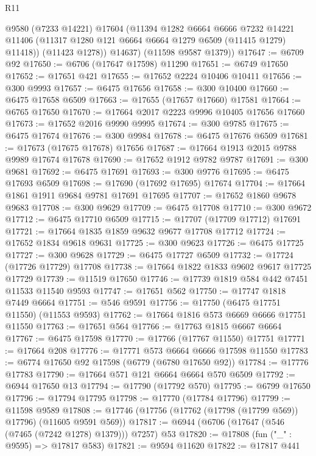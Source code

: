\begin{lexlean}{R11}
\begin{coremodule}
{{{{{{{{{{{{{{{{{{{{{{{{{{{{{{{{{{{{{{{{{{{{{{{{{{{{{{{{{{{{{{{{{{{{{{{{{{{{{{{{{{          @9580
          (@7233 @14221)
          @17604
          (@11394
            @1282
            @6664
            @6666
            @7232
            @14221
            @11406
            (@11317 @1280 @121 @6664 @6664 @1279 @6509 (@11415 @1279) @11418))
          (@11423 @1278))
        @14637)
      (@11598 @9587 @1379))
@17647 := @6709 @92
@17650 := @6706 (@17647 @17598) @11290
@17651 := @6749 @17650
@17652 := @17651 @421
@17655 := @17652 @2224 @10406 @10411
@17656 := @300 @9993
@17657 := @6475 @17656
@17658 := @300 @10400
@17660 := @6475 @17658 @6509
@17663 := @17655 (@17657 @17660) @17581
@17664 := @6765 @17650
@17670 := @17664 @2017 @2223 @9996 @10405 @17656 @17660
@17673 := @17652 @2016 @9990 @9995
@17674 := @300 @9785
@17675 := @6475 @17674
@17676 := @300 @9984
@17678 := @6475 @17676 @6509
@17681 := @17673 (@17675 @17678) @17656
@17687 := @17664 @1913 @2015 @9788 @9989 @17674 @17678
@17690 := @17652 @1912 @9782 @9787
@17691 := @300 @9681
@17692 := @6475 @17691
@17693 := @300 @9776
@17695 := @6475 @17693 @6509
@17698 := @17690 (@17692 @17695) @17674
@17704 := @17664 @1861 @1911 @9684 @9781 @17691 @17695
@17707 := @17652 @1860 @9678 @9683
@17708 := @300 @9629
@17709 := @6475 @17708
@17710 := @300 @9672
@17712 := @6475 @17710 @6509
@17715 := @17707 (@17709 @17712) @17691
@17721 := @17664 @1835 @1859 @9632 @9677 @17708 @17712
@17724 := @17652 @1834 @9618 @9631
@17725 := @300 @9623
@17726 := @6475 @17725
@17727 := @300 @9628
@17729 := @6475 @17727 @6509
@17732 := @17724 (@17726 @17729) @17708
@17738 := @17664 @1822 @1833 @9602 @9617 @17725 @17729
@17739 := @11519 @17650
@17746 := @17739 @1819 @584 @442 @7451 @11533 @11540 @9593
@17747 := @17651 @562
@17750 := @17747 @1818 @7449 @6664
@17751 := @546 @9591
@17756 := @17750 (@6475 @17751 @11550) (@11553 @9593)
@17762 := @17664 @1816 @573 @6669 @6666 @17751 @11550
@17763 := @17651 @564
@17766 := @17763 @1815 @6667 @6664
@17767 := @6475 @17598
@17770 := @17766 (@17767 @11550) @17751
@17771 := @17664 @208
@17776 := @17771 @573 @6664 @6666 @17598 @11550
@17783 := @6774 @17650 @92 @17598 (@6779 (@6780 @17650 @92))
@17784 := @17776 @17783
@17790 := @17664 @571 @121 @6664 @6664 @570 @6509
@17792 := @6944 @17650 @13
@17794 := @17790 (@17792 @570)
@17795 := @6799 @17650
@17796 := @17794 @17795
@17798 := @17770 (@17784 @17796)
@17799 := @11598 @9589
@17808 := @17746 (@17756 (@17762 (@17798 (@17799 @569)) @17796) (@11605 @9591 @569))
@17817 := @6944 (@6706 (@17647 (@546 (@7465 (@7242 @1278) @1379))) @7257) @53
@17820 := @17808 (fun ("_" : @9595) => @17817 @583)
@17821 := @9594 @11620
@17822 := @17817 @441
}}}}}}}}}}}}}}}}}}}}}}}}}}}}}}}}}}}}}}}}}}}}}}}}}}}}}}}}}}}}}}}}}}}}}}}}}}}}}}}}}}
\end{coremodule}
\end{lexlean}
